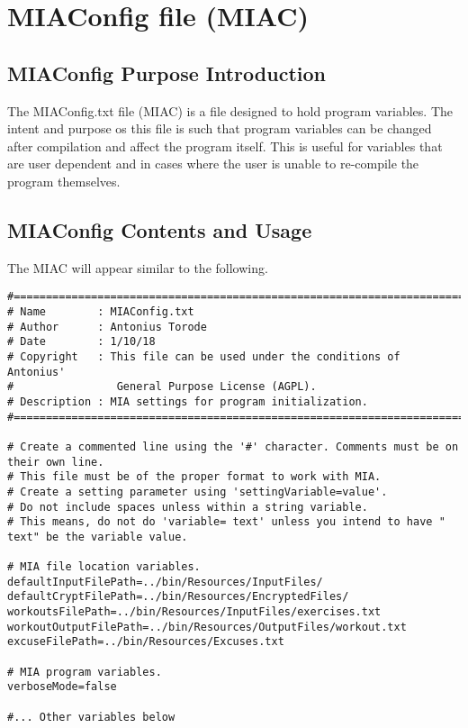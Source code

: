 \chapter{MIAConfig file (MIAC)} \label{MIAC}
\pagestyle{fancy}

\section{MIAConfig Purpose Introduction}

The MIAConfig.txt file (MIAC) is a file designed to hold program variables. The intent and purpose os this file is such that program variables can be changed after compilation and affect the program itself. This is useful for variables that are user dependent and in cases where the user is unable to re-compile the program themselves. 

\section{MIAConfig Contents and Usage}

The MIAC will appear similar to the following.

\begin{lstlisting}
#============================================================================
# Name        : MIAConfig.txt
# Author      : Antonius Torode
# Date        : 1/10/18
# Copyright   : This file can be used under the conditions of Antonius' 
#				 General Purpose License (AGPL).
# Description : MIA settings for program initialization.
#============================================================================

# Create a commented line using the '#' character. Comments must be on their own line.
# This file must be of the proper format to work with MIA.
# Create a setting parameter using 'settingVariable=value'.
# Do not include spaces unless within a string variable. 
# This means, do not do 'variable= text' unless you intend to have " text" be the variable value.

# MIA file location variables.
defaultInputFilePath=../bin/Resources/InputFiles/
defaultCryptFilePath=../bin/Resources/EncryptedFiles/
workoutsFilePath=../bin/Resources/InputFiles/exercises.txt
workoutOutputFilePath=../bin/Resources/OutputFiles/workout.txt
excuseFilePath=../bin/Resources/Excuses.txt

# MIA program variables.
verboseMode=false

#... Other variables below
\end{lstlisting}

